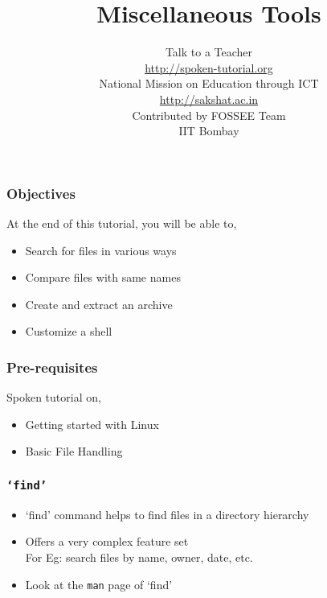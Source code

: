 \documentclass[17pt,compress]{beamer}
\author[FOSSEE]{}
\institute[IIT Bombay]{}
\date[]{}
\begin{document}
\sffamily \bfseries
\title
[Miscellaneous Tools]
{Miscellaneous Tools}
\author
[FOSSEE]
{\small Talk to a Teacher\\{\color{blue}\url{http://spoken-tutorial.org}}\\\vspace{0.25cm}National Mission on Education
 through ICT\\{\color{blue}\url{ http://sakshat.ac.in}} \\ [1.9cm]
   Contributed by FOSSEE Team \\IIT Bombay  \\[0.3cm]
}

\begin{frame}
   \titlepage
\end{frame}


\begin{frame}
\frametitle{Objectives}
\label{sec-2}

At the end of this tutorial, you will be able to,
\begin{itemize}
\item Search for files in various ways
\item Compare files with same names
\item Create and extract an archive
\item Customize a shell
\end{itemize}
\end{frame}

\begin{frame}
\frametitle{Pre-requisites}
\label{sec-3}

Spoken tutorial on,
\begin{itemize}
\item Getting started with Linux
\item Basic File Handling
\end{itemize}
\end{frame}

\begin{frame}[fragile]
  \frametitle{\texttt{`find'}}
  \begin{itemize}
  \item `find' command helps to find files in a directory hierarchy
  \item Offers a very complex feature set\\ For Eg: search files by name, owner, date, etc.
  \item Look at the \texttt{man} page of `find' 
  \end{itemize}
\end{frame}
\end{document}
